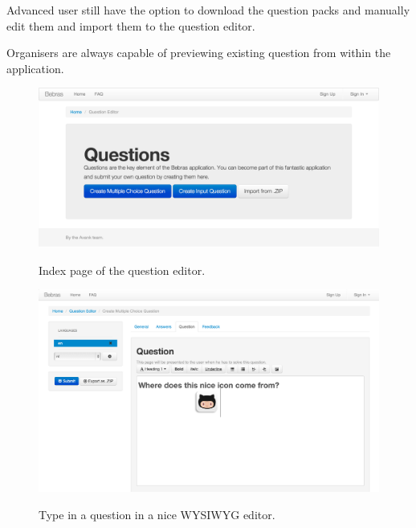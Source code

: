 \begin{section}
\begin{subsection}
        Advanced user still have the option to download the question packs and manually
        edit them and import them to the question editor.
        
        Organisers are always capable of previewing existing question from within the
        application.
        
        \begin{figure}[h!]
            \caption{Index page of the question editor.}
            \centering
            \includegraphics[width=1\textwidth]{img/index}
            \label{qe-index}
        \end{figure}
        
        \begin{figure}[h!]
            \caption{Type in a question in a nice WYSIWYG editor.}
            \centering
            \includegraphics[width=1\textwidth]{img/question}
            \label{qe-question}
        \end{figure}
        

\end{subsection}
\end{section}
